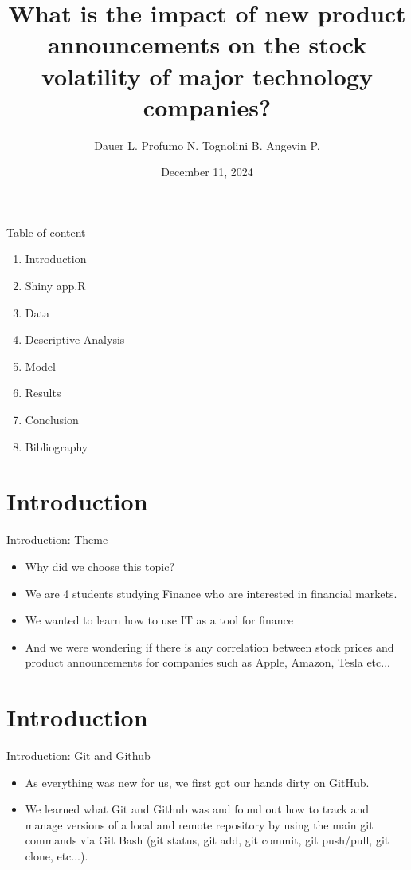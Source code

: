 \documentclass{beamer}
\title[Beamer\_DTFF]{What is the impact of new product announcements on the stock volatility of major technology companies? }
\author{Dauer L. Profumo N. Tognolini B. Angevin P.}
\date{December 11, 2024}
\begin{document}
\begin{frame}
  \titlepage
\end{frame}

\begin{frame}{Table of content}
\begin{enumerate}
    \item Introduction
    \item Shiny app.R
    \item Data 
    \item Descriptive Analysis
    \item Model
    \item Results
    \item Conclusion
    \item Bibliography
\end{enumerate}
\end{frame}


\section{Introduction}
\begin{frame}{Introduction: Theme}
  \begin{itemize}
    \item <1-> Why did we choose this topic?
    \item <2-> We are 4 students studying Finance who are interested in financial markets. 
    \item <3-> We wanted to learn how to use IT as a tool for finance
    \item <4-> And we were wondering if there is any correlation between stock prices and product announcements for companies such as Apple, Amazon, Tesla etc...
  \end{itemize}
\end{frame}
    

\section{Introduction}
\begin{frame}{Introduction: Git and Github}
  \begin{itemize}
    \item <1-> As everything was new for us, we first got our hands dirty on GitHub.
    \item <2-> We learned what Git and Github was and found out how to track and manage versions of a local and remote repository by using the main git commands via Git Bash (git status, git add, git commit, git push/pull, git clone, etc...).
    
  \end{itemize}
\end{frame}
\end{document}
